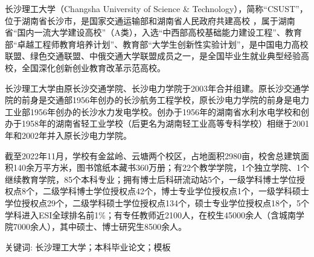 

\song\xiaosi 长沙理工大学（Changsha University of Science \& Technology），简称“CSUST”，位于湖南省长沙市，是国家交通运输部和湖南省人民政府共建高校 ，属于湖南省“国内一流大学建设高校”（A类），入选“中西部高校基础能力建设工程”、教育部“卓越工程师教育培养计划”、教育部“大学生创新性实验计划”，是中国电力高校联盟、绿色交通联盟、中俄交通大学联盟成员之一，是全国毕业生就业典型经验高校，全国深化创新创业教育改革示范高校。

长沙理工大学由原长沙交通学院、长沙电力学院于2003年合并组建。原长沙交通学院的前身是交通部1956年创办的长沙航务工程学校，原长沙电力学院的前身是电力工业部1956年创办的长沙水力发电学校。创办于1956年的湖南省水利水电学校和创办于1958年的湖南省轻工业学校（后更名为湖南轻工业高等专科学校）相继于2001年和2002年并入原长沙电力学院。

截至2022年11月，学校有金盆岭、云塘两个校区，占地面积2980亩，校舍总建筑面积140余万平方米，图书馆纸本藏书360万册；有22个教学学院，1个独立学院、1个继续教育学院，85个本科专业；拥有博士后科研流动站5个，一级学科博士学位授权点8个，二级学科博士学位授权点42个，博士专业学位授权点1个，一级学科硕士学位授权点29个，二级学科硕士学位授权点134个，硕士专业学位授权点18个，5个学科进入ESI全球排名前1\%；有专任教师近2100人，在校生45000余人（含城南学院7000余人），其中硕士、博士研究生8500余人。

\vspace{\baselineskip}
\noindent \sihao\hei 关键词: \song\xiaosi 长沙理工大学；本科毕业论文；模板